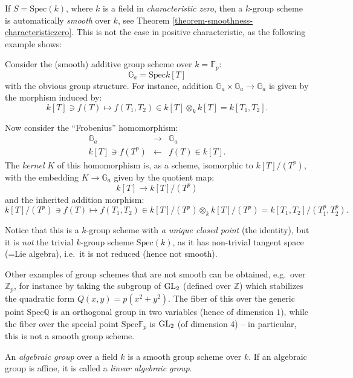  
If $S=\text{Spec}(k)$, where $k$ is a field in \emph{characteristic zero}, then a $k$-group scheme is automatically \emph{smooth} over $k$, see Theorem \ref{theorem-smoothness-characteristiczero}. This is not the case in positive characteristic, as the following example shows:

\begin{example}
 \label{example-Frobeniuskernel}
Consider the (smooth) additive group scheme over $k=\mathbb F_p$:
$$\mathbb G_a = \text{Spec} k[T]$$
with the obvious group structure. For instance, addition $\mathbb G_a\times\mathbb G_a\to \mathbb G_a$ is given by the morphism induced by: 
$$k[T] \ni f(T)\mapsto f(T_1,T_2) \in k[T]\otimes_k k[T]=k[T_1,T_2].$$


Now consider the ``Frobenius'' homomorphism:
\begin{eqnarray*}
\mathbb G_a &\to&\mathbb G_a \\
k[T] \ni f(T^p) &\leftarrow & f(T) \in k[T]. 
\end{eqnarray*}
The \emph{kernel} $K$ of this homomorphism is, as a scheme, isomorphic to $k[T]/(T^p)$, with the embedding $K\to \mathbb G_a$ given by the quotient map:
$$k[T] \to k[T]/(T^p)$$
and the inherited addition morphism:
$$k[T]/(T^p) \ni f(T)\mapsto f(T_1,T_2) \in k[T]/(T^p)\otimes_k k[T]/(T^p)=k[T_1,T_2]/(T_1^p,T_2^p).$$

Notice that this is a $k$-group scheme with \emph{a unique closed point} (the identity), but it is \emph{not} the trivial $k$-group scheme $\text{Spec}(k)$, as it has non-trivial tangent space (=Lie algebra), i.e.\ it is not reduced (hence not smooth).
\end{example}





Other examples of group schemes that are not smooth can be obtained, e.g.\, over $\mathbb Z_p$, for instance by taking the subgroup of ${\rm GL}_2$ (defined over $\mathbb Z$) which stabilizes the quadratic form $Q(x,y)=p(x^2+y^2)$. The fiber of this over the generic point $\text{Spec} \mathbb Q$ is an orthogonal group in two variables (hence of dimension $1$), while the fiber over the special point $\text{Spec} \mathbb F_p$ is ${\rm GL}_2$ (of dimension $4$) -- in particular, this is not a smooth group scheme. 

\begin{definition}
 \label{definition-algebraic-group}
An {\it algebraic group} over a field $k$ is a smooth group scheme over $k$. If an algebraic group is affine, it is called a {\it linear algebraic group}.
\end{definition}

